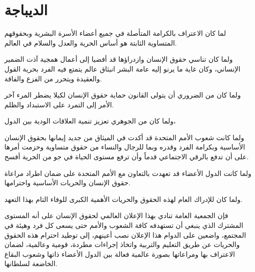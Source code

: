 \documentclass[11pt, letterpaper]{article}
\begin{document}
\section*{\textarabic{الديباجة}}
\leavevmode

\textarabic{
     لما كان الاعتراف بالكرامة المتأصلة في جميع أعضاء الأسرة البشرية وبحقوقهم المتساوية الثابتة هو أساس الحرية والعدل والسلام في العالم.
}
\vspace{0.5em}

\textarabic{
ولما كان تناسي حقوق الإنسان وازدراؤها قد أفضيا إلى أعمال همجية آذت الضمير الإنساني، وكان غاية ما يرنو إليه عامة البشر انبثاق عالم يتمتع فيه الفرد بحرية القول والعقيدة ويتحرر من الفزع والفاقة.
}
\vspace{0.5em}

\textarabic{
ولما كان من الضروري أن يتولى القانون حماية حقوق الإنسان لكيلا يضطر المرء آخر الأمر إلى التمرد على الاستبداد والظلم.
}
\vspace{0.5em}

\textarabic{
ولما كان من الجوهري تعزيز تنمية العلاقات الودية بين الدول،
}
\vspace{0.5em}

\textarabic{
ولما كانت شعوب الأمم المتحدة قد أكدت في الميثاق من جديد إيمانها بحقوق الإنسان الأساسية وبكرامة الفرد وقدره وبما للرجال والنساء من حقوق متساوية وحزمت أمرها على أن تدفع بالرقي الاجتماعي قدماً وأن ترفع مستوى الحياة في جو من الحرية أفسح.
}
\vspace{0.5em}

\textarabic{
ولما كانت الدول الأعضاء قد تعهدت بالتعاون مع الأمم المتحدة على ضمان اطراد مراعاة حقوق الإنسان والحريات الأساسية واحترامها.
}
\vspace{0.5em}

\textarabic{
ولما كان للإدراك العام لهذه الحقوق والحريات الأهمية الكبرى للوفاء التام بهذا التعهد.
}
\vspace{0.5em}

\textarabic{
فإن الجمعية العامة تنادي بهذا الإعلان العالمي لحقوق الإنسان على أنه المستوى المشترك الذي ينبغي أن تستهدفه كافة الشعوب والأمم حتى يسعى كل فرد وهيئة في المجتمع، واضعين على الدوام هذا الإعلان نصب أعينهم، إلى توطيد احترام هذه الحقوق والحريات عن طريق التعليم والتربية واتخاذ إجراءات مطردة، قومية وعالمية، لضمان الاعتراف بها ومراعاتها بصورة عالمية فعالة بين الدول الأعضاء ذاتها وشعوب البقاع الخاضعة لسلطانها.
}
\end{document}
